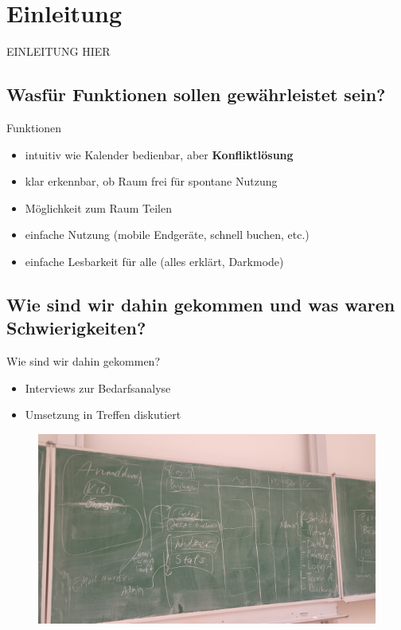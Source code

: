 \section{Einleitung}

\begin{frame}{}{}
    EINLEITUNG HIER
\end{frame}

\subsection[nötige Funktionen]{Wasfür Funktionen sollen gewährleistet sein?}

\begin{frame}{Funktionen}
    \begin{itemize}
        \item intuitiv wie Kalender bedienbar, aber \textrightarrow  \textbf{Konfliktlösung}
        \item klar erkennbar, ob Raum frei für spontane Nutzung
        \item Möglichkeit zum Raum Teilen
        \item einfache Nutzung (mobile Endgeräte, schnell buchen, etc.)
        \item einfache Lesbarkeit für alle (alles erklärt, Darkmode)
    \end{itemize}
\end{frame}

\subsection[Werdegang und Schwierigkeiten]{Wie sind wir dahin gekommen und was waren Schwierigkeiten?}

\begin{frame}{Wie sind wir dahin gekommen?}
    \begin{itemize}
        \item Interviews zur Bedarfsanalyse
        \item Umsetzung in Treffen diskutiert
    \end{itemize}
\end{frame}

\begin{frame}
    \begin{figure}
        \centering
        \includegraphics[width=0.6\linewidth]{pictures/BrainstormTafelbild}
        \label{fig: Tafelbild Brainstorm}
    \end{figure}
\end{frame}

